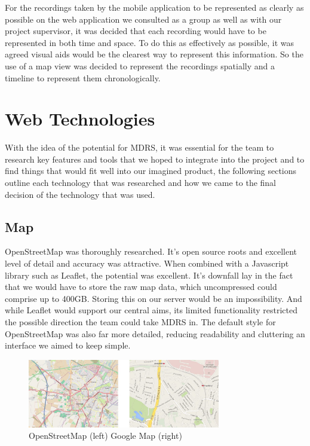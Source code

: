 \documentclass{l3proj}
\begin{document}
For the recordings taken by the mobile application to be represented as clearly as possible on the web application we consulted as a group as well as with our project supervisor, it was decided that each recording would have to be represented in both time and space. To do this as effectively as possible, it was agreed visual aids would be the clearest way to represent this information. So the use of a map view was decided to represent the recordings spatially and a timeline to represent them chronologically.

\section{Web Technologies}

With the idea of the potential for MDRS, it was essential for the team to research key features and tools that we hoped to integrate into the project and to find things that would fit well into our imagined product, the following sections outline each technology that was researched and how we came to the final decision of the technology that was used.

\subsection{Map}

OpenStreetMap was thoroughly researched. It's open source roots and excellent level of detail and accuracy was attractive. When combined with a Javascript library such as Leaflet, the potential was excellent. It’s downfall lay in the fact that we would have to store the raw map data, which uncompressed could comprise up to 400GB. Storing this on our server would be an impossibility. And while Leaflet would support our central aims, its limited functionality restricted the possible direction the team could take MDRS in. The default style for OpenStreetMap was also far more detailed, reducing readability and cluttering an interface we aimed to keep simple.

\begin{figure}[ht!]
  \centering
\includegraphics[width=0.75\textwidth]{images/openstreetmap_google-map.jpg}
\caption{OpenStreetMap (left) Google Map (right)}
\end{figure}
\end{document}
